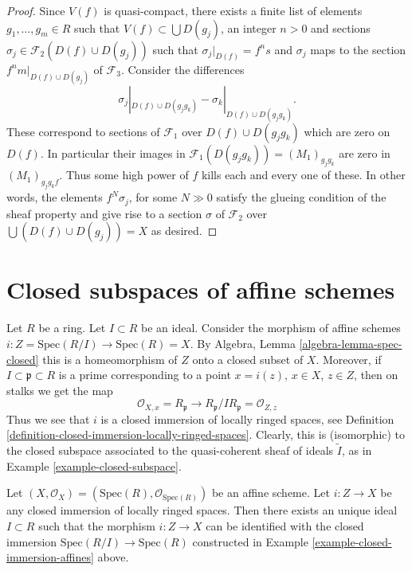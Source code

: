 \begin{proof}
\medskip\noindent
Since $V(f)$ is quasi-compact, there exists a finite list
of elements $g_1, \ldots, g_m \in R$ such that
$V(f) \subset \bigcup D(g_j)$, an integer $n > 0$ and sections
$\sigma_j \in \mathcal{F}_2(D(f) \cup D(g_j))$ such that
$\sigma_j|_{D(f)} = f^n s$ and $\sigma_j$ maps to the section
$f^nm|_{D(f) \cup D(g_j)}$ of $\mathcal{F}_3$.
Consider the differences
$$
\sigma_j|_{D(f) \cup D(g_jg_k)}
-
\sigma_k|_{D(f) \cup D(g_jg_k)}.
$$
These correspond to sections of $\mathcal{F}_1$
over $D(f) \cup D(g_jg_k)$ which are zero
on $D(f)$. In particular their images in
$\mathcal{F}_1(D(g_jg_k)) = (M_1)_{g_jg_k}$
are zero in $(M_1)_{g_jg_kf}$.
Thus some high power of $f$ kills each and every one of these.
In other words, the elements $f^N \sigma_j$, for some $N \gg 0$
satisfy the glueing condition of the sheaf property and
give rise to a section $\sigma $ of $\mathcal{F}_2$
over $\bigcup (D(f) \cup D(g_j)) = X$ as desired.
\end{proof}







\section{Closed subspaces of affine schemes}
\label{section-closed-in-affine}

\begin{example}
\label{example-closed-immersion-affines}
Let $R$ be a ring.
Let $I \subset R$ be an ideal.
Consider the morphism of affine schemes
$i : Z = \text{Spec}(R/I) \to \text{Spec}(R) = X$.
By Algebra, Lemma \ref{algebra-lemma-spec-closed}
this is a homeomorphism of $Z$ onto a closed
subset of $X$. Moreover, if $I \subset \mathfrak p \subset R$
is a prime corresponding to a point $x = i(z)$, $x \in X$,
$z \in Z$, then on stalks we get the map
$$
\mathcal{O}_{X, x} = R_{\mathfrak p}
\longrightarrow
R_{\mathfrak p}/IR_{\mathfrak p} = \mathcal{O}_{Z, z}
$$
Thus we see that $i$ is a closed immersion of locally ringed spaces,
see Definition \ref{definition-closed-immersion-locally-ringed-spaces}.
Clearly, this is (isomorphic) to the closed subspace associated
to the quasi-coherent sheaf of ideals $\widetilde I$, as in
Example \ref{example-closed-subspace}.
\end{example}

\begin{lemma}
\label{lemma-closed-immersion-affine-case}
Let $(X, \mathcal{O}_X) = (\text{Spec}(R), \mathcal{O}_{\text{Spec}(R)})$
be an affine scheme. Let $i : Z \to X$ be any closed immersion
of locally ringed spaces. Then there exists an unique ideal
$I \subset R$ such that the morphism $i : Z \to X$ can be identified
with the closed immersion $\text{Spec}(R/I) \to \text{Spec}(R)$
constructed in Example \ref{example-closed-immersion-affines} above.
\end{lemma}

